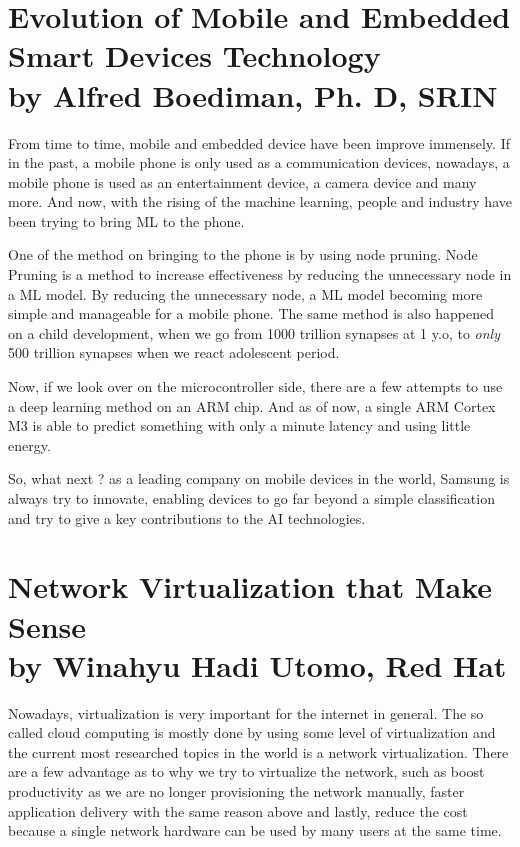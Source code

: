 \documentclass[12pt, a4paper]{article}
\begin{document}
\section*{Evolution of Mobile and Embedded Smart Devices Technology \\ \footnotesize by Alfred Boediman, Ph. D, SRIN}

From time to time, mobile and embedded device have been improve immensely. If in the past, a mobile phone is only used as a communication devices, nowadays, a mobile phone is used as an entertainment device, a camera device and many more. And now, with the rising of the machine learning, people and industry have been trying to bring ML to the phone.

One of the method on bringing to the phone is by using node pruning. Node Pruning is a method to increase effectiveness by reducing the unnecessary node in a ML model. By reducing the unnecessary node, a ML model becoming more simple and manageable for a mobile phone. The same method is also happened on a child development, when we go from 1000 trillion synapses at 1 y.o, to \textit{only} 500 trillion synapses when we react adolescent period.

Now, if we look over on the microcontroller side, there are a few attempts to use a deep learning method on an ARM chip. And as of now, a single ARM Cortex M3 is able to predict something with only a minute latency and using little energy.

So, what next ? as a leading company on mobile devices in the world, Samsung is always try to innovate, enabling devices to go far beyond a simple classification and try to give a key contributions to the AI technologies.

\section*{Network Virtualization that Make Sense \\ \footnotesize by Winahyu Hadi Utomo, Red Hat}

Nowadays, virtualization is very important for the internet in general. The so called cloud computing is mostly done by using some level of virtualization and the current most researched topics in the world is a network virtualization. There are a few advantage as to why we try to virtualize the network, such as boost productivity as we are no longer provisioning the network manually, faster application delivery with the same reason above and lastly, reduce the cost because a single network hardware can be used by many users at the same time.
\end{document}
